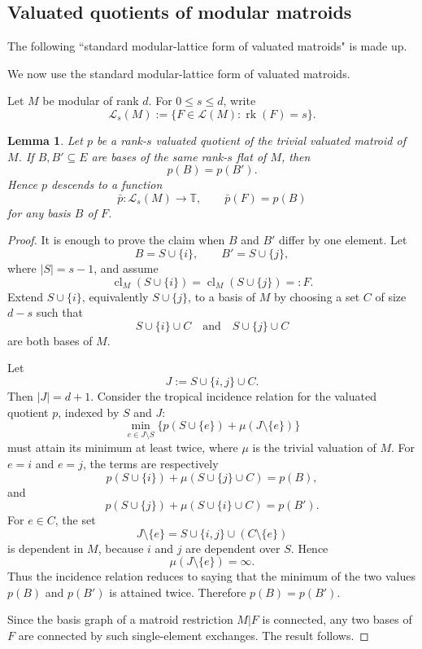 \documentclass[12pt]{article}
\newcommand{\rk}{\operatorname{rk}}
\newcommand{\cl}{\operatorname{cl}}
\newcommand{\cL}{\mathcal L}
\theoremstyle{plain}
\newtheorem{lemma}[theorem]{Lemma}
\theoremstyle{definition}
\newcommand{\review}[1]{\begin{reviewbox}#1\end{reviewbox}}
\begin{document}
\subsection{Valuated quotients of modular matroids}

\review{The following ``standard modular-lattice form of valuated matroids" is made up.}

We now use the standard modular-lattice form of valuated matroids.

Let \(M\) be modular of rank \(d\).  For \(0\le s\le d\), write
\[
   \cL_s(M):=\{F\in \cL(M):\rk(F)=s\}.
\]

\begin{lemma}\label{lem:flat-invariance}
Let \(p\) be a rank-\(s\) valuated quotient of the trivial valuated matroid of \(M\).  If \(B,B'\subseteq E\) are bases of the same rank-\(s\) flat of \(M\), then
\[
   p(B)=p(B').
\]
Hence \(p\) descends to a function
\[
   \bar p:\cL_s(M)\longrightarrow \mathbb T,\qquad
   \bar p(F)=p(B)
\]
for any basis \(B\) of \(F\).
\end{lemma}

\begin{proof}
It is enough to prove the claim when \(B\) and \(B'\) differ by one element.  Let
\[
   B=S\cup\{i\},\qquad B'=S\cup\{j\},
\]
where \(|S|=s-1\), and assume
\[
   \cl_M(S\cup\{i\})=\cl_M(S\cup\{j\})=:F.
\]
Extend \(S\cup\{i\}\), equivalently \(S\cup\{j\}\), to a basis of \(M\) by choosing a set \(C\) of size \(d-s\) such that
\[
   S\cup\{i\}\cup C
   \quad\text{and}\quad
   S\cup\{j\}\cup C
\]
are both bases of \(M\).

Let
\[
   J:=S\cup\{i,j\}\cup C.
\]
Then \(|J|=d+1\).  Consider the tropical incidence relation for the valuated quotient \(p\), indexed by \(S\) and \(J\):
\[
   \min_{e\in J\setminus S}\{p(S\cup\{e\})+\mu(J\setminus\{e\})\}
\]
must attain its minimum at least twice, where \(\mu\) is the trivial valuation of \(M\).  For \(e=i\) and \(e=j\), the terms are respectively
\[
   p(S\cup\{i\})+\mu(S\cup\{j\}\cup C)=p(B),
\]
and
\[
   p(S\cup\{j\})+\mu(S\cup\{i\}\cup C)=p(B').
\]
For \(e\in C\), the set
\[
   J\setminus\{e\}=S\cup\{i,j\}\cup(C\setminus\{e\})
\]
is dependent in \(M\), because \(i\) and \(j\) are dependent over \(S\).  Hence
\[
   \mu(J\setminus\{e\})=\infty.
\]
Thus the incidence relation reduces to saying that the minimum of the two values \(p(B)\) and \(p(B')\) is attained twice.  Therefore \(p(B)=p(B')\).

Since the basis graph of a matroid restriction \(M|F\) is connected, any two bases of \(F\) are connected by such single-element exchanges.  The result follows.
\end{proof}
\end{document}
